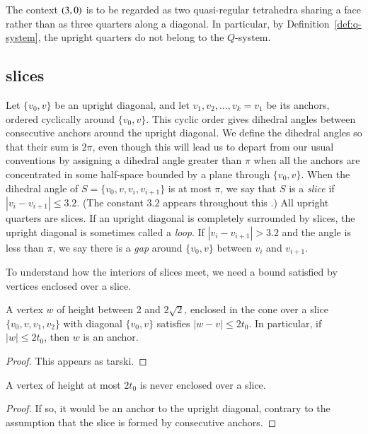 The context $\relax(3,0)$ is to be regarded as two
quasi-regular tetrahedra sharing a face rather than as three
quarters along a diagonal.  In particular, by
Definition~\ref{def:q-system}, the upright quarters do not belong
to the $Q$-system.

\subsection{slices} %
    \label{sec:slice}  %

Let $\{v_0,v\}$ be an upright diagonal, and let
$v_1,v_2,\ldots,v_k=v_1$ be its anchors, ordered cyclically around
$\{v_0,v\}$.  This cyclic order gives dihedral angles between
consecutive anchors around the upright diagonal. We define the
dihedral angles so that their sum is $2\pi$, even though this will
lead us to depart from our usual conventions by assigning a
dihedral angle greater than $\pi$ when all the anchors are
concentrated in some half-space bounded by a plane through
$\{v_0,v\}$. When the dihedral angle of $S=\{v_0,v,v_i,v_{i+1}\}$ is at
most $\pi$, we say that $S$ is a {\it slice\/} if
$|v_i-v_{i+1}|\le3.2$. (The constant $3.2$ appears throughout this
\chap.) All upright quarters are slices. If an upright
diagonal is completely surrounded by slices, the
upright diagonal is sometimes called a {\it loop}. If
$|v_i-v_{i+1}|>3.2$ and the angle is less than $\pi$, we say there
is a {\it gap\/} around $\{v_0,v\}$ between $v_i$ and $v_{i+1}$.

To understand how the interiors of slices meet, we
need a bound satisfied by vertices enclosed over a slice.


\begin{lemma}
    \label{lemma:anc-simplex-not-enc}
A vertex $w$ of height between 2 and $2\sqrt{2}$, enclosed in the cone
over a slice $\{v_0,v,v_1,v_2\}$ with diagonal $\{v_0,v\}$ satisfies
$|w-v|\le 2t_0$. In particular, if $|w|\le 2t_0$, then $w$ is an anchor.
\end{lemma}

\begin{proof}
This appears as tarski.
\end{proof}


\begin{corollary}
A vertex of height at most $2t_0$ is never enclosed over a slice.
\end{corollary}

\begin{proof}  If so, it would be an anchor to the upright diagonal, contrary to
the assumption that the slice is formed by consecutive
anchors.
\end{proof}


